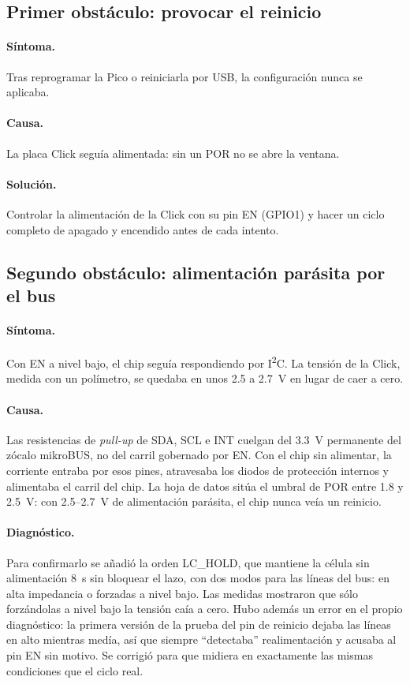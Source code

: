 \subsection{Primer obstáculo: provocar el reinicio}

\paragraph{Síntoma.} Tras reprogramar la Pico o reiniciarla por USB, la configuración nunca se
aplicaba.

\paragraph{Causa.} La placa Click seguía alimentada: sin un POR no se abre la ventana.

\paragraph{Solución.} Controlar la alimentación de la Click con su pin EN (GPIO1) y hacer un ciclo
completo de apagado y encendido antes de cada intento.

\subsection{Segundo obstáculo: alimentación parásita por el bus}

\paragraph{Síntoma.} Con EN a nivel bajo, el chip seguía respondiendo por I\textsuperscript{2}C. La
tensión de la Click, medida con un polímetro, se quedaba en unos \num{2.5} a \SI{2.7}{\volt} en lugar
de caer a cero.

\paragraph{Causa.} Las resistencias de \emph{pull-up} de SDA, SCL e INT cuelgan del \SI{3.3}{\volt}
permanente del zócalo mikroBUS, no del carril gobernado por EN. Con el chip sin alimentar, la
corriente entraba por esos pines, atravesaba los diodos de protección internos y alimentaba el carril
del chip. La hoja de datos sitúa el umbral de POR entre \num{1.8} y \SI{2.5}{\volt}: con
\num{2.5}--\SI{2.7}{\volt} de alimentación parásita, el chip nunca veía un reinicio.

\paragraph{Diagnóstico.} Para confirmarlo se añadió la orden LC\_HOLD, que mantiene la célula sin
alimentación \SI{8}{\second} sin bloquear el lazo, con dos modos para las líneas del bus: en alta
impedancia o forzadas a nivel bajo. Las medidas mostraron que sólo forzándolas a nivel bajo la
tensión caía a cero. Hubo además un error en el propio diagnóstico: la primera versión de la prueba
del pin de reinicio dejaba las líneas en alto mientras medía, así que siempre ``detectaba''
realimentación y acusaba al pin EN sin motivo. Se corrigió para que midiera en exactamente las mismas
condiciones que el ciclo real.

